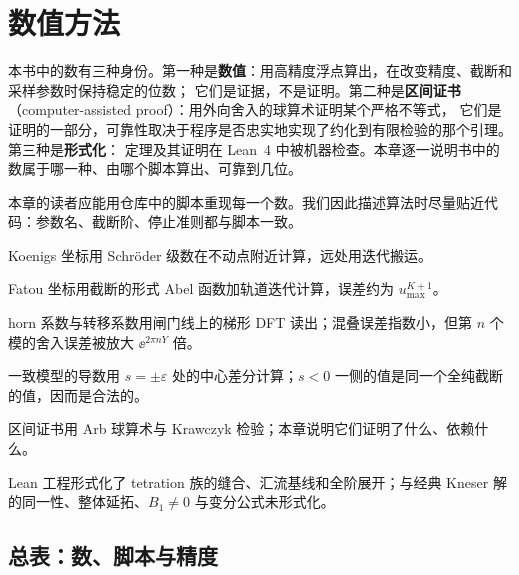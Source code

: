 \providecommand{\leancode}[1]{{\fontspec{Menlo}[Scale=0.85]#1}}
\providecommand{\leansym}[1]{{\fontspec{STIX Two Math}#1}}

\chapter{数值方法}\label{ch:numerics}

本书中的数有三种身份。第一种是\textbf{数值}：用高精度浮点算出，在改变精度、截断和采样参数时保持稳定的位数；
它们是证据，不是证明。第二种是\textbf{区间证书}（computer-assisted proof）：用外向舍入的球算术证明某个严格不等式，
它们是证明的一部分，可靠性取决于程序是否忠实地实现了约化到有限检验的那个引理。第三种是\textbf{形式化}：
定理及其证明在 Lean~4 中被机器检查。本章逐一说明书中的数属于哪一种、由哪个脚本算出、可靠到几位。

本章的读者应能用仓库中的脚本重现每一个数。我们因此描述算法时尽量贴近代码：参数名、截断阶、停止准则都与脚本一致。

\begin{goals}
\item Koenigs 坐标用 Schr\"oder 级数在不动点附近计算，远处用迭代搬运。
\item Fatou 坐标用截断的形式 Abel 函数加轨道迭代计算，误差约为 $u_{\max}^{K+1}$。
\item horn 系数与转移系数用闸门线上的梯形 DFT 读出；混叠误差指数小，但第 $n$ 个模的舍入误差被放大 $\ee^{2\pi nY}$ 倍。
\item 一致模型的导数用 $s=\pm\varepsilon$ 处的中心差分计算；$s<0$ 一侧的值是同一个全纯截断的值，因而是合法的。
\item 区间证书用 Arb 球算术与 Krawczyk 检验；本章说明它们证明了什么、依赖什么。
\item Lean 工程形式化了 tetration 族的缝合、汇流基线和全阶展开；与经典 Kneser 解的同一性、整体延拓、$B_1\ne0$ 与变分公式未形式化。
\end{goals}

\section{总表：数、脚本与精度}\label{ch11:sec:table}

